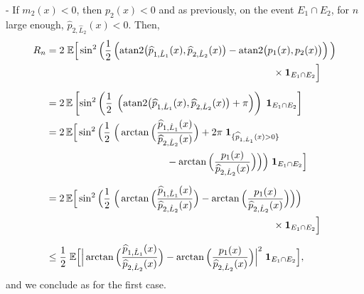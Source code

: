 \documentclass[11pt,a4paper,openany]{article}
\newcommand{\Atan}{\mbox{atan2}}
\def\E{\mathbb{E}}
\begin{document}
{	\noindent  
	- If $m_2(x) < 0$, then $p_{2}(x) < 0$ and as previously, on the event $E_1  \cap   E_2$, for $n$ large enough, $ \widehat{p}_{2, \hat L_2}(x) < 0$. Then,
	\begin{align*}
		R_n&= 2 \hspace{0.1cm}  \E \Big[ \sin^2 \Big( \frac{ 1}{ 2}  \left (  \Atan \big( \widehat{p}_{1, \hat L_1}(x) , \widehat{p}_{2, \hat L_2}(x)\big)  -  \Atan \big( p_{1}(x), p_{2}(x)\big)  \right ) \Big)  
		\\
		& \hspace{8cm} \times    \mathbf{1}_{E_1 \cap E_2} \Big]
		\\[0.2cm]  
		&= 2 \, \E \left [ \sin^2 \left ( \frac{1}{2} \hspace{0.1cm}   \left (  \Atan \big( \widehat{p}_{1, \hat L_1}(x) , \widehat{p}_{2, \hat L_2}(x)\big)  +\pi  \right ) \right)  \hspace{0.1cm}    \mathbf{1}_{E_1 \cap E_2 } \right]
		\\
		&= 2 \, \E \Big[ \sin^2 \Big( \frac{1}{2}  \hspace{0.1cm}    \Big(  \arctan \Big( \dfrac{ \widehat{p}_{1, \hat L_1}(x)}{ \widehat{p}_{2, \hat L_2}(x)}  \Big) + 2 \pi \hspace{0.1cm}   \mathbf{1}_{\{ \widehat{p}_{1, \hat L_1}(x)> 0\}}  
		\\
		& \hspace{4.25cm}  -  \arctan \Big( \dfrac{ p_{1}(x)}{ \widehat{p}_{2, \hat L_2}(x)}  \Big) \Big) \Big)   \hspace{0.1cm}    \mathbf{1}_{E_1 \cap E_2 }\Big]
		\\[0.2cm]  
		&= 2 \, \E \Big[ \sin^2 \Big( \frac{1}{2} \hspace{0.1cm}   \Big(  \arctan \Big( \dfrac{ \widehat{p}_{1, \hat L_1}(x)}{ \widehat{p}_{2, \hat L_2}(x)}  \Big)  -  \arctan \Big( \dfrac{ p_{1}(x)}{ \widehat{p}_{2, \hat L_2}(x)}  \Big) \Big) \Big) 
		\\
		& \hspace{8cm}  \times    \mathbf{1}_{E_1 \cap  E_2} \Big]    
		\\[0.2cm]
		&\leq \frac{1}{2}  \hspace{0.1cm}  \E  \Big[ \Big| \arctan \Big( \dfrac{ \widehat{p}_{1, \hat L_1}(x)}{ \widehat{p}_{2, \hat L_2}(x)}  \Big)  -  \arctan \Big( \dfrac{p_{1}(x)}{ \widehat{p}_{2, \hat L_2}(x)} \Big) \Big|^{2} \hspace{0.1cm}   \mathbf{1}_{E_1\cap E_2 } \Big],  
	\end{align*}
	and we conclude as for the first case.
}
\end{document}
